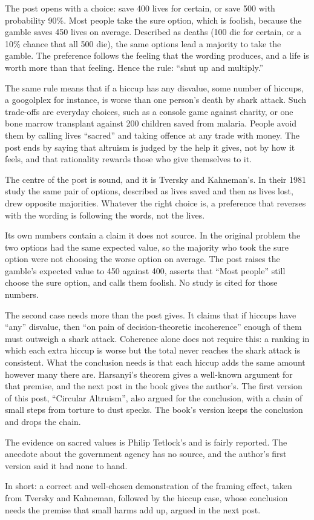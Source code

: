 \begin{afterword}
\summaryhead

The post opens with a choice: save 400 lives for certain, or save 500 with probability 90\%. Most people take the sure option, which is foolish, because the gamble saves 450 lives on average. Described as deaths (100 die for certain, or a 10\% chance that all 500 die), the same options lead a majority to take the gamble. The preference follows the feeling that the wording produces, and a life is worth more than that feeling. Hence the rule: ``shut up and multiply.''

The same rule means that if a hiccup has any disvalue, some number of hiccups, a googolplex for instance, is worse than one person's death by shark attack. Such trade-offs are everyday choices, such as a console game against charity, or one bone marrow transplant against 200 children saved from malaria. People avoid them by calling lives ``sacred'' and taking offence at any trade with money. The post ends by saying that altruism is judged by the help it gives, not by how it feels, and that rationality rewards those who give themselves to it.

\responsehead

The centre of the post is sound, and it is Tversky and Kahneman's. In their 1981 study the same pair of options, described as lives saved and then as lives lost, drew opposite majorities. Whatever the right choice is, a preference that reverses with the wording is following the words, not the lives.

Its own numbers contain a claim it does not source. In the original problem the two options had the same expected value, so the majority who took the sure option were not choosing the worse option on average. The post raises the gamble's expected value to 450 against 400, asserts that ``Most people'' still choose the sure option, and calls them foolish. No study is cited for those numbers.

The second case needs more than the post gives. It claims that if hiccups have ``any'' disvalue, then ``on pain of decision-theoretic incoherence'' enough of them must outweigh a shark attack. Coherence alone does not require this: a ranking in which each extra hiccup is worse but the total never reaches the shark attack is consistent. What the conclusion needs is that each hiccup adds the same amount however many there are. Harsanyi's theorem gives a well-known argument for that premise, and the next post in the book gives the author's. The first version of this post, ``Circular Altruism'', also argued for the conclusion, with a chain of small steps from torture to dust specks. The book's version keeps the conclusion and drops the chain.

The evidence on sacred values is Philip Tetlock's and is fairly reported. The anecdote about the government agency has no source, and the author's first version said it had none to hand.

In short: a correct and well-chosen demonstration of the framing effect, taken from Tversky and Kahneman, followed by the hiccup case, whose conclusion needs the premise that small harms add up, argued in the next post.
\end{afterword}

